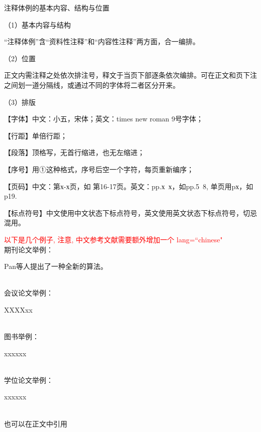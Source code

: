 注释体例的基本内容、结构与位置

（1）基本内容与结构

“注释体例”含“资料性注释”和“内容性注释”两方面，合一编排。

（2）位置

正文内需注释之处依次排注号，释文于当页下部逐条依次编排。可在正文和页下注之间划一道分隔线，或通过不同的字体将二者区分开来。

（3）排版

【字体】中文：小五，宋体；英文：times new roman 9号字体；

【行距】单倍行距；

【段落】顶格写，无首行缩进，也无左缩进；

【序号】用①这种格式，序号后空一个字符，每页重新编序；

【页码】中文：第х-х页，如 第16-17页。英文：pp.х~х，如pp.5~8, 单页用pх，如p19.

【标点符号】中文使用中文状态下标点符号，英文使用英文状态下标点符号，切忌混用。

\textcolor{red}{以下是几个例子, 注意, 中文参考文献需要额外增加一个 lang=``chinese"}
~\\
期刊论文举例：

Pan等人提出了一种全新的算法\cite{pan2018classification, pan2014cell, song2013asynchronous, lin2022adaptive}。

~\\
会议论文举例：

XXXXxx\cite{li2021large}

~\\
图书举例：

xxxxxx\cite{shavlik1990readings, yan2006CFG}

~\\
学位论文举例：

xxxxxx\cite{jxd1996, CCPT}

~\\
也可以在正文中引用




